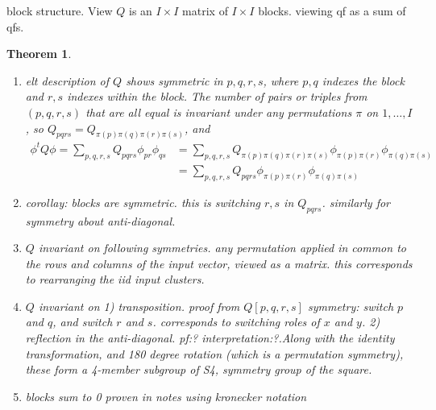 \documentclass{article}
\newcommand{\I}{I}
\newcommand{\Q}{Q}
\newtheorem{theorem}{Theorem}
\begin{document}
\begin{enumerate}
\begin{enumerate}
block structure. View $\Q$ is an $\I\times\I$ matrix of $\I\times\I$ blocks. viewing qf as a sum of qfs. 

\begin{theorem}
\begin{enumerate}
  \item elt description of $\Q$ shows symmetric in $p,q,r,s$, where $p,q$
indexes the block and $r,s$ indexes within the block. The number of pairs or triples from $(p,q,r,s)$ that are all equal is invariant under any permutations $\pi$ on $1,\ldots,\I$, so $\Q_{pqrs}=\Q_{\pi(p)\pi(q)\pi(r)\pi(s)}$, and
\begin{align}
  \phi^t\Q\phi=\sum_{p,q,r,s}\Q_{pqrs}\phi_{pr}\phi_{qs}&=\sum_{p,q,r,s}\Q_{\pi(p)\pi(q)\pi(r)\pi(s)}\phi_{\pi(p)\pi(r)}\phi_{\pi(q)\pi(s)}\\
                                                        &=\sum_{p,q,r,s}\Q_{pqrs}\phi_{\pi(p)\pi(r)}\phi_{\pi(q)\pi(s)}
\end{align}

\item corollay: blocks are symmetric. this is switching $r,s$ in $\Q_{pqrs}$. similarly for symmetry about anti-diagonal.

\item $\Q$ invariant on following symmetries. any permutation applied in
common to the rows and columns of the input vector, viewed as a
matrix. this corresponds to rearranging the iid input clusters.

\item $\Q$ invariant on 1) transposition. proof from $\Q[p,q,r,s]$
  symmetry: switch $p$ and $q$, and switch $r$ and $s$. corresponds to
  switching roles of $x$ and $y$. 2) reflection in the anti-diagonal.
  pf:? interpretation:?.Along with the identity transformation, and
  180 degree rotation (which is a permutation symmetry), these form a
  4-member subgroup of S4, symmetry group of the square.

\item blocks sum to 0 proven in notes using kronecker notation
  
\end{enumerate}
\end{theorem}




\end{enumerate}
\end{enumerate}
\end{document}
